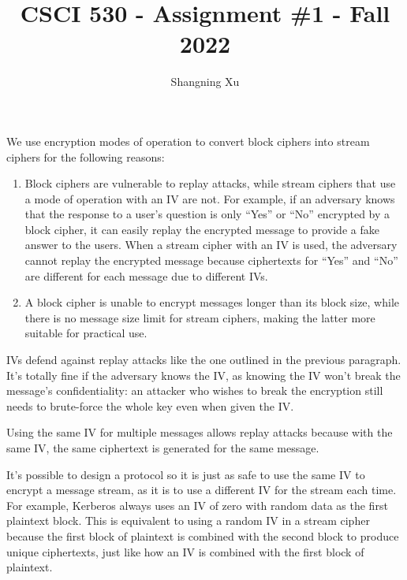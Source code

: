 \documentclass{article}
\title{CSCI 530 - Assignment \#1 - Fall 2022}
\author{Shangning Xu}
\begin{document}
\maketitle

\section{}

We use encryption modes of operation to convert block ciphers into stream ciphers for the following reasons:
\begin{enumerate}
    \item Block ciphers are vulnerable to replay attacks, while stream ciphers that use a mode of operation with an IV are not. For example, if an adversary knows that the response to a user's question is only ``Yes'' or ``No'' encrypted by a block cipher, it can easily replay the encrypted message to provide a fake answer to the users. When a stream cipher with an IV is used, the adversary cannot replay the encrypted message because ciphertexts for ``Yes'' and ``No'' are different for each message due to different IVs.
    \item A block cipher is unable to encrypt messages longer than its block size, while there is no message size limit for stream ciphers, making the latter more suitable for practical use.
\end{enumerate}

IVs defend against replay attacks like the one outlined in the previous paragraph. It's totally fine if the adversary knows the IV, as knowing the IV won't break the message's confidentiality: an attacker who wishes to break the encryption still needs to brute-force the whole key even when given the IV.

Using the same IV for multiple messages allows replay attacks because with the same IV, the same ciphertext is generated for the same message.

It's possible to design a protocol so it is just as safe to use the same IV to encrypt a message stream, as it is to use a different IV for the stream each time. For example, Kerberos always uses an IV of zero with random data as the first plaintext block. This is equivalent to using a random IV in a stream cipher because the first block of plaintext is combined with the second block to produce unique ciphertexts, just like how an IV is combined with the first block of plaintext.

\section{}
\end{document}
